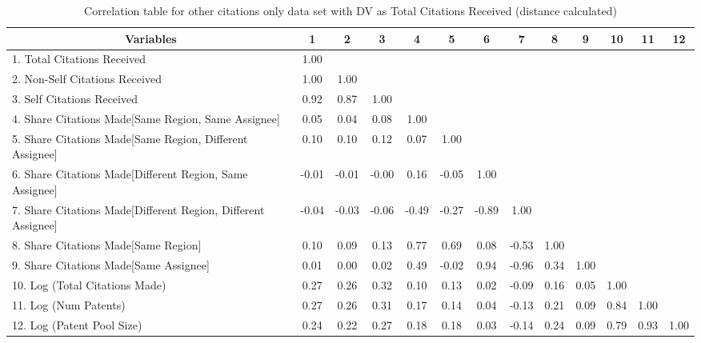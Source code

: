 \begin{table}[htbp]\centering \caption{Correlation table for other citations only data set with DV as Total Citations Received (distance calculated)\label{o.tcorrelation}}
\scriptsize
\singlespacing
\begin{adjustbox}{angle=90}
\begin{tabular}{l  c  c  c  c  c  c  c  c  c  c  c  c }\hline\hline
\multicolumn{1}{c}{Variables} &1&2&3&4&5&6&7&8&9&10&11&12\\ \hline
1. Total Citations Received&1.00\\
2. Non-Self Citations Received&1.00&1.00\\
3. Self Citations Received&0.92&0.87&1.00\\
4. Share Citations Made[Same Region, Same Assignee]&0.05&0.04&0.08&1.00\\
5. Share Citations Made[Same Region, Different Assignee]&0.10&0.10&0.12&0.07&1.00\\
6. Share Citations Made[Different Region, Same Assignee]&-0.01&-0.01&-0.00&0.16&-0.05&1.00\\
7. Share Citations Made[Different Region, Different Assignee]&-0.04&-0.03&-0.06&-0.49&-0.27&-0.89&1.00\\
8. Share Citations Made[Same Region]&0.10&0.09&0.13&0.77&0.69&0.08&-0.53&1.00\\
9. Share Citations Made[Same Assignee]&0.01&0.00&0.02&0.49&-0.02&0.94&-0.96&0.34&1.00\\
10. Log (Total Citations Made)&0.27&0.26&0.32&0.10&0.13&0.02&-0.09&0.16&0.05&1.00\\
11. Log (Num Patents)&0.27&0.26&0.31&0.17&0.14&0.04&-0.13&0.21&0.09&0.84&1.00\\
12. Log (Patent Pool Size)&0.24&0.22&0.27&0.18&0.18&0.03&-0.14&0.24&0.09&0.79&0.93&1.00\\
\hline \hline 
 \end{tabular}
 \end{adjustbox}
\end{table}
